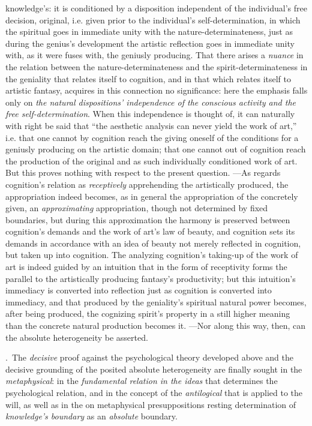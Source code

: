 \documentclass[12pt,a4paper]{book}
\begin{document}
knowledge's: it is conditioned by a disposition independent of the individual's free decision,
original, i.e. given prior to the individual's self-determination, in which the spiritual goes in
immediate unity with the nature-determinateness, just as during the genius's development the
artistic reflection goes in immediate unity with, as it were fuses with, the geniusly producing.
That there arises a \emph{nuance} in the relation between the nature-determinateness and the
spirit-determinateness in the geniality that relates itself to cognition, and in that which
relates itself to artistic fantasy, acquires in this connection no significance: here the emphasis
falls only on \emph{the natural dispositions' independence of the conscious activity and the free
self-determination}. When this independence is thought of, it can naturally with right be said
that ``the aesthetic analysis can never yield the work of art,'' i.e. that one cannot by cognition
reach the giving oneself of the conditions for a geniusly producing on the artistic domain; that
one cannot out of cognition reach the production of the original and as such individually
conditioned work of art. But this proves nothing with respect to the present question. ---As
regards cognition's relation as \emph{receptively} apprehending the artistically produced, the
appropriation indeed becomes, as in general the appropriation of the concretely given, an
\emph{approximating} appropriation, though not determined by fixed boundaries, but during this
approximation the harmony is preserved between cognition's demands and the work of art's law of
beauty, and cognition sets its demands in accordance with an idea of beauty not merely reflected in
cognition, but taken up into cognition. The analyzing cognition's taking-up of the work of art is
indeed guided by an intuition that in the form of receptivity forms the parallel to the
artistically producing fantasy's productivity; but this intuition's immediacy is converted into
reflection just as cognition is converted into immediacy, and that produced by the geniality's
spiritual natural power becomes, after being produced, the cognizing spirit's property in a still
higher meaning than the concrete natural production becomes it. ---Nor along this way, then, can
the absolute heterogeneity be asserted.

\medskip

.~The \emph{decisive} proof against the psychological theory developed above and the
decisive grounding of the posited absolute heterogeneity are finally sought in the
\emph{metaphysical}: in the \emph{fundamental relation in the ideas} that determines the
psychological relation, and in the concept of the \emph{antilogical} that is applied to the will,
as well as in the on metaphysical presuppositions resting determination of \emph{knowledge's boundary}
as an \emph{absolute} boundary.
\end{document}
